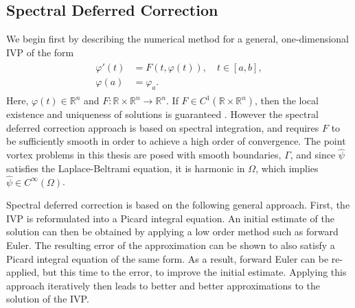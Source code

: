 \documentclass{sfuthesis}
\begin{document}

\subsection{Spectral Deferred Correction} 
\label{sec: SDC}
We begin first by describing the numerical method for a general, one-dimensional IVP of the form 
\begin{align}
	\begin{split}
	\varphi'(t)&=F(t, \varphi(t)), \quad t\in [a,b], \\ \label{eq: SDC_IVP}
	\varphi(a)&=\varphi_a.
	\end{split}
\end{align}
Here, $\varphi(t) \in \mathbb{R}^n$ and $F: \mathbb{R} \times \mathbb{R}^n \rightarrow \mathbb{R}^n$. If $F \in C^1(\mathbb{R}\times \mathbb{R}^n)$, then the local existence and uniqueness of solutions is guaranteed \cite{Dutt2000, NumAn2011}. However the spectral deferred correction approach is based on spectral integration, and requires $F$ to be sufficiently smooth in order to achieve a high order of convergence. The point vortex problems in this thesis are posed with smooth boundaries, $\Gamma$, and since $\hat{\psi}$ satisfies the Laplace-Beltrami equation, it is harmonic in $\Omega$, which implies $\hat{\psi} \in C^{\infty}(\Omega)$. 

Spectral deferred correction is based on the following general approach. First, the IVP is reformulated into a Picard integral equation. An initial estimate of the solution can then be obtained by applying a low order method such as forward Euler. The resulting error of the approximation can be shown to also satisfy a Picard integral equation of the same form. As a result, forward Euler can be re-applied, but this time to the error, to improve the initial estimate. Applying this approach iteratively then leads to better and better approximations to the solution of the IVP. 
\end{document}

